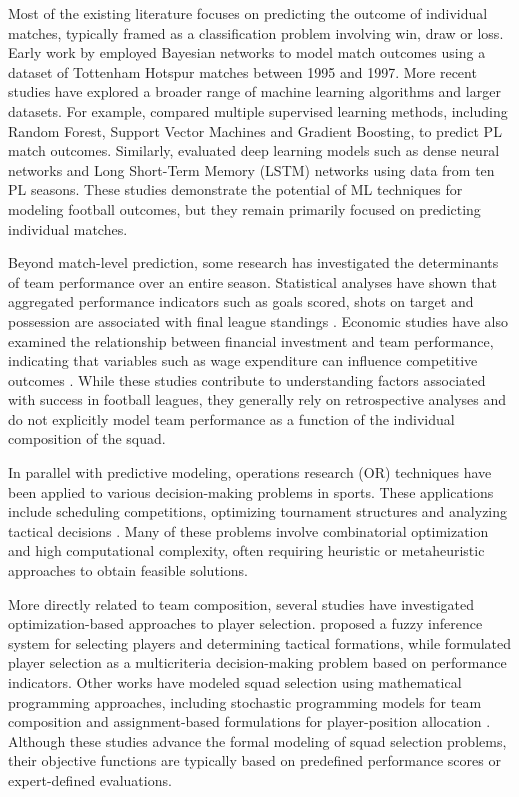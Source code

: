 \documentclass[12pt]{article}
\begin{document}
Most of the existing literature focuses on predicting the outcome of individual matches, typically framed as a classification problem involving win, 
draw or loss. Early work by \cite{Joseph2006} employed Bayesian networks to model match outcomes using a dataset of Tottenham Hotspur matches between 1995 and 1997. 
More recent studies have explored a broader range of machine learning algorithms and larger datasets. For example, \cite{Baboota2019} compared multiple 
supervised learning methods, including Random Forest, Support Vector Machines and Gradient Boosting, to predict PL match outcomes. 
Similarly, \cite{Awadallah2020} evaluated deep learning models such as dense neural networks and Long Short-Term Memory (LSTM) networks using data from ten PL seasons. 
These studies demonstrate the potential of ML techniques for modeling football outcomes, but they remain primarily focused on predicting individual matches.

Beyond match-level prediction, some research has investigated the determinants of team performance over an entire season. 
Statistical analyses have shown that aggregated performance indicators such as goals scored, shots on target and possession are associated with 
final league standings \cite{LagoBallesteros2010}. Economic studies have also examined the relationship between financial investment and team performance, 
indicating that variables such as wage expenditure can influence competitive outcomes \cite{Carmichael2011}. While these studies contribute to 
understanding factors associated with success in football leagues, they generally rely on retrospective analyses and do not explicitly model team 
performance as a function of the individual composition of the squad.

In parallel with predictive modeling, operations research (OR) techniques have been applied to various decision-making problems in sports. 
These applications include scheduling competitions, optimizing tournament structures and analyzing tactical decisions \cite{Kendall2010}. 
Many of these problems involve combinatorial optimization and high computational complexity, often requiring heuristic or metaheuristic approaches 
to obtain feasible solutions.

More directly related to team composition, several studies have investigated optimization-based approaches to player selection. \cite{Tavana2013} 
proposed a fuzzy inference system for selecting players and determining tactical formations, while \cite{Qader2017} formulated player selection as a 
multicriteria decision-making problem based on performance indicators. Other works have modeled squad selection using mathematical programming approaches, 
including stochastic programming models for team composition \cite{Pantuso2017} and assignment-based formulations for player-position allocation \cite{Boon2003}. 
Although these studies advance the formal modeling of squad selection problems, their objective functions are typically based on 
predefined performance scores or expert-defined evaluations.
\end{document}
